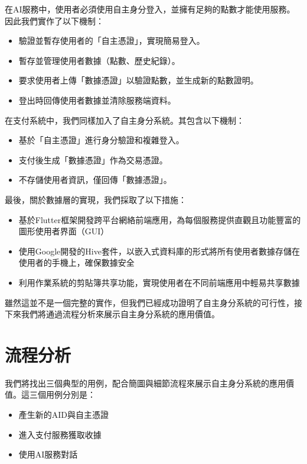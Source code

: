在AI服務中，使用者必須使用自主身分登入，並擁有足夠的點數才能使用服務。因此我們實作了以下機制：
\begin{itemize}
  \item 驗證並暫存使用者的「自主憑證」，實現簡易登入。
  \item 暫存並管理使用者數據（點數、歷史紀錄）。
  \item 要求使用者上傳「數據憑證」以驗證點數，並生成新的點數證明。
  \item 登出時回傳使用者數據並清除服務端資料。
\end{itemize}
在支付系統中，我們同樣加入了自主身分系統。其包含以下機制：
\begin{itemize}
  \item 基於「自主憑證」進行身分驗證和複雜登入。
  \item 支付後生成「數據憑證」作為交易憑證。
  \item 不存儲使用者資訊，僅回傳「數據憑證」。
\end{itemize}
最後，關於數據層的實現，我們採取了以下措施：
\begin{itemize}
  \item 基於Flutter框架開發跨平台網絡前端應用，為每個服務提供直觀且功能豐富的圖形使用者界面（GUI）
  \item 使用Google開發的Hive套件，以嵌入式資料庫的形式將所有使用者數據存儲在使用者的手機上，確保數據安全
  \item 利用作業系統的剪貼簿共享功能，實現使用者在不同前端應用中輕易共享數據
\end{itemize}
雖然這並不是一個完整的實作，但我們已經成功證明了自主身分系統的可行性，接下來我們將通過流程分析來展示自主身分系統的應用價值。
\section{流程分析}
我們將找出三個典型的用例，配合簡圖與細節流程來展示自主身分系統的應用價值。這三個用例分別是：
\begin{itemize}
  \item 產生新的AID與自主憑證
  \item 進入支付服務獲取收據
  \item 使用AI服務對話
\end{itemize}
